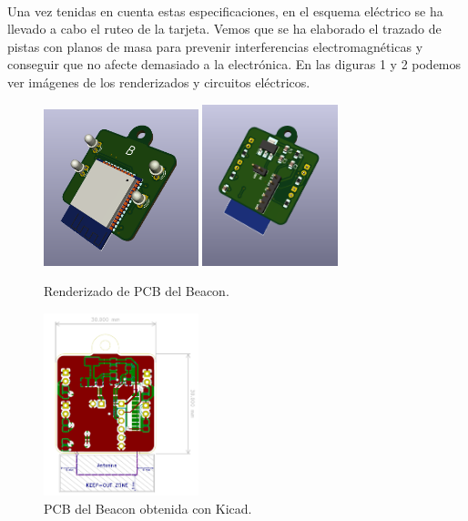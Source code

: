 \documentclass[paper=a4, fontsize=11pt,twoside]{scrartcl}	%
\begin{document}
        \paragraph{}
        Una vez tenidas en cuenta estas especificaciones, en el esquema eléctrico se ha llevado a cabo el ruteo de la tarjeta.
        Vemos que se ha elaborado el trazado de pistas con planos de masa para prevenir interferencias electromagnéticas
        y conseguir que no afecte demasiado a la electrónica. En las diguras 1 y 2 podemos ver imágenes de los renderizados y circuitos 
        eléctricos.
        \begin{center}
            \begin{figure}[H]
                \centering
                \includegraphics[width=0.4\textwidth]{../emiter_1.PNG}
                \includegraphics[width=0.35\textwidth]{../emiter_2.PNG}
                \caption{Renderizado de PCB del Beacon.}
                \label{fig:mesh8}
            \end{figure}    
        \end{center}
        \begin{center}
            \begin{figure}[H]
                \centering
                \includegraphics[width=0.40\textwidth]{../emiter_PCB.PNG}
                \caption{PCB del Beacon obtenida con Kicad.}
                \label{fig:mesh9}
            \end{figure}    
        \end{center}
\end{document}
